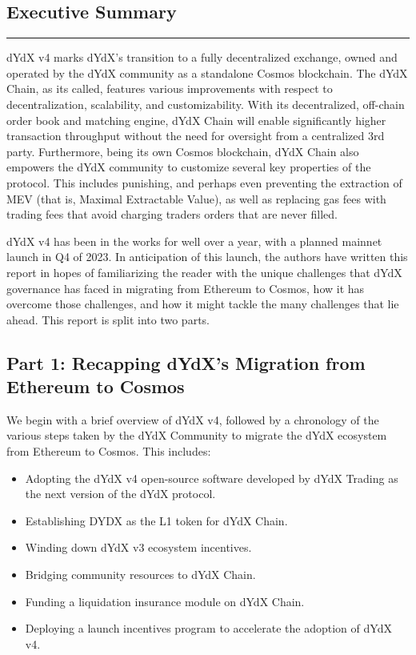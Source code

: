 \begin{fullwidth}
    
    \begin{adjustwidth}{1cm}{1cm}
        \section{Executive Summary} \label{sec:summary}
    
        \textcolor{gray}{\rule{\linewidth}{0.1mm}}
    
        dYdX v4 marks dYdX's transition to a fully decentralized exchange, owned and operated by the dYdX community as a standalone Cosmos blockchain. The dYdX Chain, as its called, features various improvements with respect to decentralization, scalability, and customizability. With its decentralized, off-chain order book and matching engine, dYdX Chain will enable significantly higher transaction throughput without the need for oversight from a centralized 3rd party. Furthermore, being its own Cosmos blockchain, dYdX Chain also empowers the dYdX community to customize several key properties of the protocol. This includes punishing, and perhaps even preventing the extraction of MEV (that is, Maximal Extractable Value), as well as replacing gas fees with trading fees that avoid charging traders orders that are never filled.

        dYdX v4 has been in the works for well over a year, with a planned mainnet launch in Q4 of 2023. In anticipation of this launch, the authors have written this report in hopes of familiarizing the reader with the unique challenges that dYdX governance has faced in migrating from Ethereum to Cosmos, how it has overcome those challenges, and how it might tackle the many challenges that lie ahead. This report is split into two parts.

        \subsection*{Part 1: Recapping dYdX’s Migration from Ethereum to Cosmos} 
        
        We begin with a brief overview of dYdX v4, followed by a chronology of the various steps taken by the dYdX Community to migrate the dYdX ecosystem from Ethereum to Cosmos. This includes:
        
        \begin{itemize}
            \item Adopting the dYdX v4 open-source software developed by dYdX Trading as the next version of the dYdX protocol.
            \item Establishing DYDX as the L1 token for dYdX Chain.
            \item Winding down dYdX v3 ecosystem incentives.
            \item Bridging community resources to dYdX Chain.
            \item Funding a liquidation insurance module on dYdX Chain.
            \item Deploying a launch incentives program to accelerate the adoption of dYdX v4.
        \end{itemize}
    

\end{adjustwidth}
\end{fullwidth}
